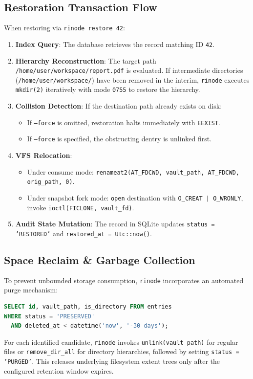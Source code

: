 \documentclass[11pt,a4paper]{article}
\begin{document}
\subsection{Restoration Transaction Flow}
When restoring via \texttt{rinode restore 42}:
\begin{enumerate}[leftmargin=1.5em]
    \item \textbf{Index Query}: The database retrieves the record matching ID \texttt{42}.
    \item \textbf{Hierarchy Reconstruction}: The target path \texttt{/home/user/workspace/report.pdf} is evaluated. If intermediate directories (\texttt{/home/user/workspace/}) have been removed in the interim, \texttt{rinode} executes \texttt{mkdir(2)} iteratively with mode \texttt{0755} to restore the hierarchy.
    \item \textbf{Collision Detection}: If the destination path already exists on disk:
    \begin{itemize}
        \item If \texttt{--force} is omitted, restoration halts immediately with \texttt{EEXIST}.
        \item If \texttt{--force} is specified, the obstructing dentry is unlinked first.
    \end{itemize}
    \item \textbf{VFS Relocation}:
    \begin{itemize}
        \item Under consume mode: \texttt{renameat2(AT\_FDCWD, vault\_path, AT\_FDCWD, orig\_path, 0)}.
        \item Under snapshot fork mode: \texttt{open} destination with \texttt{O\_CREAT | O\_WRONLY}, invoke \texttt{ioctl(FICLONE, vault\_fd)}.
    \end{itemize}
    \item \textbf{Audit State Mutation}: The record in SQLite updates \texttt{status = 'RESTORED'} and \texttt{restored\_at = Utc::now()}.
\end{enumerate}

\subsection{Space Reclaim \& Garbage Collection}
To prevent unbounded storage consumption, \texttt{rinode} incorporates an automated purge mechanism:
\begin{lstlisting}[language=SQL]
SELECT id, vault_path, is_directory FROM entries 
WHERE status = 'PRESERVED' 
  AND deleted_at < datetime('now', '-30 days');
\end{lstlisting}
For each identified candidate, \texttt{rinode} invokes \texttt{unlink(vault\_path)} for regular files or \texttt{remove\_dir\_all} for directory hierarchies, followed by setting \texttt{status = 'PURGED'}. This releases underlying filesystem extent trees only after the configured retention window expires.
\end{document}
